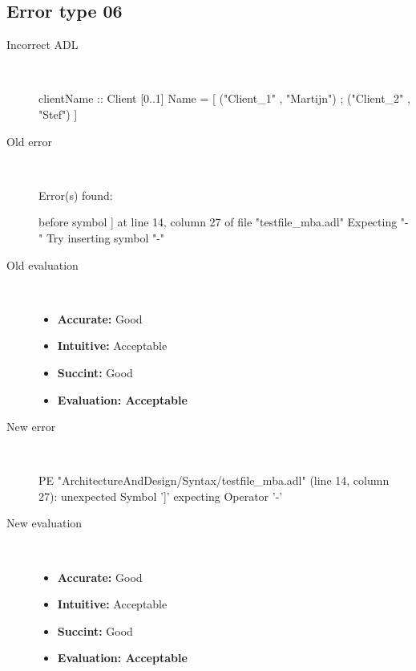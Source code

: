 \hrulefill

\subsection{Error type 06}
  \begin{description}
  \item[Incorrect ADL]~\\
\begin{adl}
clientName :: Client [0..1] Name =
    [ ("Client_1"      , "Martijn")
    ; ("Client_2"      , "Stef")
    ]\end{adl}
  \item[Old error]~\\
\begin{haskell}
Error(s) found:

before symbol ] at line 14, column 27 of file "testfile_mba.adl"
Expecting "-"
Try inserting symbol "-"
\end{haskell}
  \item[Old evaluation]~\\
    \begin{itemize}
    \item \textbf{Accurate:} Good
    \item \textbf{Intuitive:} Acceptable
    \item \textbf{Succint:} Good
    \item \textbf{Evaluation: Acceptable}
    \end{itemize}
  \item[New error]~\\
\begin{haskell}
PE "ArchitectureAndDesign/Syntax/testfile_mba.adl" (line 14, column 27):
unexpected Symbol ']'
expecting Operator '-'\end{haskell}
  \item[New evaluation]~\\
    \begin{itemize}
    \item \textbf{Accurate:} Good
    \item \textbf{Intuitive:} Acceptable
    \item \textbf{Succint:} Good
    \item \textbf{Evaluation: Acceptable
}
    \end{itemize}
  \end{description}

\hrulefill


